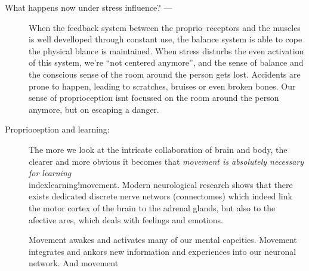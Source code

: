 \documentclass[../main.tex]{subfiles}
\begin{document}
\begin{description}
\item[What happens now under stress influence? ---]
  When the feedback system between the proprio--receptors and the muscles is well develloped through constant use, the balance system is able to cope the physical blance is maintained.
  When stress disturbs the even activation of this system, we're ``not centered anymore'', and the sense of balance and the conscious sense of the room around the person gets lost.
  Accidents are prone to happen, leading to scratches, bruises or even broken bones.
  Our sense of proprioception isnt focussed on the room around the person anymore, but on escaping a danger.
\item[Proprioception and learning:] The more we look at the intricate collaboration of brain and body, the clearer and more obvious it becomes that \emph{movement is absolutely necessary for learning}\\index{learning!movement}.
  Modern neurological research\cite{Connectome} shows that there exists dedicated discrete nerve networs (connectomes) which indeed link the motor cortex of the brain to the adrenal glands, but also to the afective ares, which deals with feelings and emotions.

  Movement awakes and activates many of our mental capcities. Movement integrates and ankors new information and experiences into our neuronal network.
  And movement 
  
\end{description}
\end{document}
